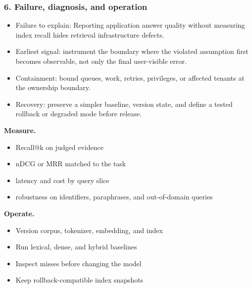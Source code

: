 \subsubsection*{6. Failure, diagnosis, and operation}
\begin{itemize}
\item Failure to explain: Reporting application answer quality without measuring index recall hides retrieval infrastructure defects.
\item Earliest signal: instrument the boundary where the violated assumption first becomes observable, not only the final user-visible error.
\item Containment: bound queues, work, retries, privileges, or affected tenants at the ownership boundary.
\item Recovery: preserve a simpler baseline, version state, and define a tested rollback or degraded mode before release.
\end{itemize}
\textbf{Measure.}\begin{itemize}
\item Recall@k on judged evidence
\item nDCG or MRR matched to the task
\item latency and cost by query slice
\item robustness on identifiers, paraphrases, and out-of-domain queries
\end{itemize}
\textbf{Operate.}\begin{itemize}
\item Version corpus, tokenizer, embedding, and index
\item Run lexical, dense, and hybrid baselines
\item Inspect misses before changing the model
\item Keep rollback-compatible index snapshots
\end{itemize}
